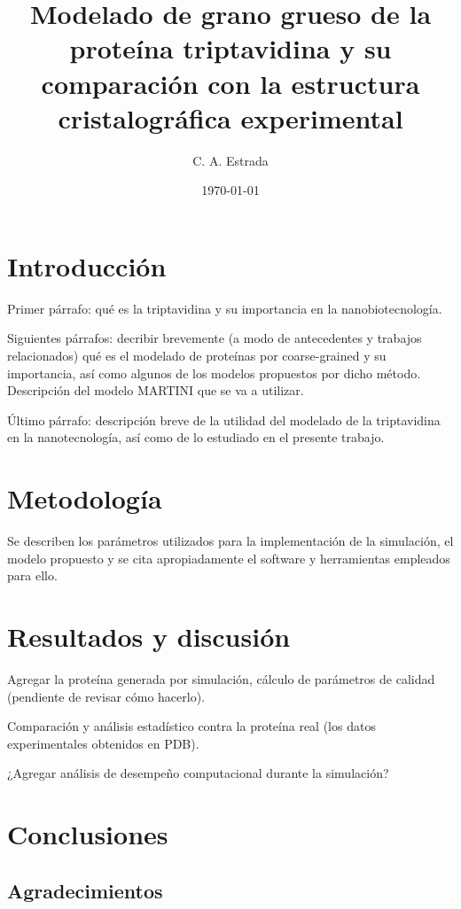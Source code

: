 \documentclass[a4paper,twocolumn,12pt]{article}
\title{\bf Modelado de grano grueso de la proteína triptavidina y su comparación con la estructura cristalográfica experimental}
\date{\today}
\author{C. A. Estrada}
\begin{document}

\section{Introducción}
Primer párrafo: qué es la triptavidina y su importancia en la nanobiotecnología. 

Siguientes párrafos: decribir brevemente (a modo de antecedentes y trabajos relacionados) qué es el modelado de proteínas por coarse-grained y su importancia, así como algunos de los modelos propuestos por dicho método. Descripción del modelo MARTINI que se va a utilizar.

Último párrafo: descripción breve de la utilidad del modelado de la triptavidina en la nanotecnología, así como de lo estudiado en el presente trabajo.


\section{Metodología}
Se describen los parámetros utilizados para la implementación de la simulación, el modelo propuesto y se cita apropiadamente el software y herramientas \cite{R} empleados para ello.


\section{Resultados y discusión}
Agregar la proteína generada por simulación, cálculo de parámetros de calidad (pendiente de revisar cómo hacerlo).

Comparación y análisis estadístico contra la proteína real (los datos experimentales obtenidos en PDB).

¿Agregar análisis de desempeño computacional durante la simulación? 


\section{Conclusiones}


\subsection*{Agradecimientos}




\end{document}
